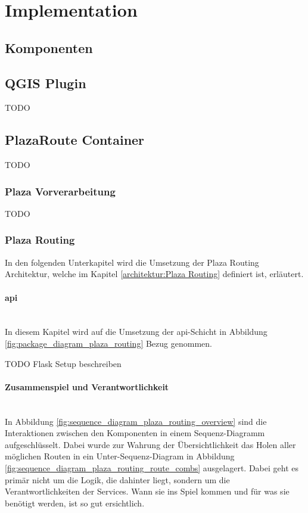 
\section{Implementation}
\label{sec:Implementation}

\subsection{Komponenten}
\label{impl:Komponenten}

\subsection{QGIS Plugin}
\label{impl:QGIS Plugin}
TODO

\subsection{PlazaRoute Container}
\label{impl:PlazaRoute Container}
TODO

\subsubsection{Plaza Vorverarbeitung}
\label{impl:Plaza Vorverarbeitung}
TODO

\subsubsection{Plaza Routing}
\label{impl:Plaza Routing}
In den folgenden Unterkapitel wird die Umsetzung der Plaza Routing Architektur, welche im Kapitel \ref{architektur:Plaza Routing} definiert ist, erläutert. 

\paragraph{api}\label{impl:Plaza Routing api}~\\
In diesem Kapitel wird auf die Umsetzung der api-Schicht in Abbildung \ref{fig:package_diagram_plaza_routing} Bezug genommen.

TODO Flask Setup beschreiben

\paragraph{Zusammenspiel und Verantwortlichkeit}\label{impl:Plaza Routing Zusammenspielund Verantwortlichkeit}~\\
In Abbildung \ref{fig:sequence_diagram_plaza_routing_overview} sind die Interaktionen zwischen den Komponenten in einem Sequenz-Diagramm aufgeschlüsselt. Dabei wurde zur Wahrung der Übersichtlichkeit das Holen aller möglichen Routen in ein Unter-Sequenz-Diagram in Abbildung \ref{fig:sequence_diagram_plaza_routing_route_combs} ausgelagert. Dabei geht es primär nicht um die Logik, die dahinter liegt, sondern um die Verantwortlichkeiten der Services. Wann sie ins Spiel kommen und für was sie benötigt werden, ist so gut ersichtlich.

